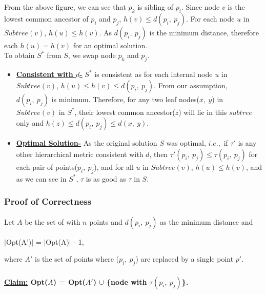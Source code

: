 \documentclass[pdftex,a4paper,12pt]{report}
\newcommand{\abs}[1] {$\mid #1 \mid$}
\begin{document}
	From the above figure, we can see that $p_k$ is sibling of $p_i$. Since node $v$ is the lowest
	common ancestor of $p_i$ and $p_j$, $h(v)\leq d(p_i,\ p_j)$. For each node $u$ in $Subtree(v)$,
	$h(u)\leq h(v)$. As $d(p_i,\ p_j)$ is the minimum distance, therefore each $h(u)=h(v)$ for an 
	optimal solution.\\
	To obtain $S^*$ from $S$, we swap node $p_k$ and $p_j$.
	\begin{itemize}
		\item \underline{\textbf{Consistent with $d$-}} $S^*$ is consistent as for each internal
		node $u$ in $Subtree(v)$, $h(u)\leq h(v)\leq d(p_i,\ p_j)$. From our assumption, 
		$d(p_i,\ p_j)$ is minimum. Therefore, for any two leaf nodes($x,\ y$) in $Subtree(v)$ in $S^*$,
		their lowest common ancestor($z$) will lie in this $subtree$ only and $h(z)\leq d(p_i,\ p_j)
		\leq d(x,\ y)$.
		\item \underline{\textbf{Optimal Solution-}} As the original solution $S$ was optimal, $i.e.,$
		if $\tau'$ is any other hierarchical metric consistent with $d$, then $\tau'(p_i,\ p_j) \leq 
		\tau(p_i,\ p_j)$ for each pair of points($p_i,\ p_j$), and for all $u$ in $Subtree(v)$, 
		$h(u)\leq h(v)$, and as we can see in $S^*$, $\tau$ is as good as $\tau$ in $S$.
	\end{itemize}
	\subsubsection{Proof of Correctness}
	Let $A$ be the set of with $n$ points and $d(p_i,\ p_j)$ as the minimum distance and
	\begin{center}	 
	\abs{$Opt(A')$} = \abs{$Opt(A)$} - 1, 
	\end{center}
	where $A'$ is the set of points where ($p_i,\ p_j$) are 
	replaced by a single point $p'$.\\\\
	\textbf{\underline{Claim:} Opt($A$) = Opt($A'$) $\cup$ \{node with $\tau(p_i,\ p_j)$\}.}
	
\end{document}
